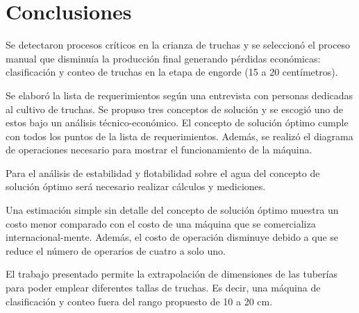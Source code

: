 
\pagestyle{myportland}
\doublespacing
\chapter*{\centering \large Conclusiones}
\thispagestyle{myportland}

Se detectaron procesos críticos en la crianza de truchas y se seleccionó el proceso manual que disminuía la producción final generando pérdidas económicas: clasificación y conteo de truchas en la etapa de engorde (15 a 20 centímetros).

Se elaboró la lista de requerimientos según una entrevista con personas dedicadas al cultivo de truchas. Se propuso tres conceptos de solución y se escogió uno de estos bajo un análisis técnico-económico. El concepto de solución óptimo cumple con todos los puntos de la lista de requerimientos. Además, se realizó el diagrama de operaciones necesario para mostrar el funcionamiento de la máquina.

Para el análisis de estabilidad y flotabilidad sobre el agua del concepto de solución óptimo será necesario realizar cálculos y mediciones.

Una estimación simple sin detalle del concepto de solución óptimo muestra un costo menor comparado con el costo de una máquina que se comercializa internacional-mente. Además, el costo de operación disminuye debido a que se reduce el número de operarios de cuatro a solo uno.

El trabajo presentado permite la extrapolación de dimensiones de las tuberías para poder emplear diferentes tallas de truchas. Es decir, una máquina de clasificación y conteo fuera del rango propuesto de 10 a 20 cm.